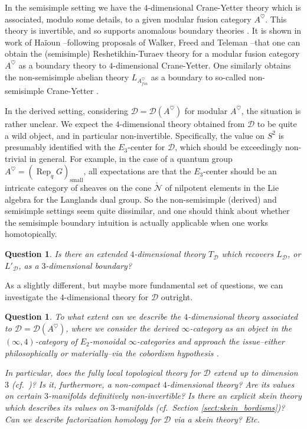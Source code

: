 \documentclass[reqno]{amsart}
\newtheorem{question}[lemma]{Question}
\theoremstyle{definition}
\newcommand{\mcl}[1]{\mathcal{#1}}
\newcommand{\msc}[1]{\mathscr{#1}}
\newcommand{\opn}[1]{\operatorname{#1}}
\DeclareMathOperator{\Rep}{Rep}
\renewcommand{\1}{\mathbf{1}}
\begin{document}
In the semisimple setting we have the $4$-dimensional Crane-Yetter theory which is associated, modulo some details, to a given modular fusion category $A^{\heartsuit}$.  This theory is invertible, and so supports anomalous boundary theories \cite{johnsonscheimbauer17}.  It is shown in work of Ha\"ioun \cite{haioun}--following proposals of Walker, Freed and Teleman \cite{walker1,walker2,freedteleman14}--that one can obtain the (semisimple) Reshetikhin-Turaev theory for a modular fusion category $A^{\heartsuit}$ as a boundary theory to $4$-dimensional Crane-Yetter. One similarly obtains the non-semisimple abelian theory $L_{A^{\heartsuit}_{fin}}$ as a boundary to so-called non-semisimple Crane-Yetter \cite{brochieretal21,haioun}.
\par

In the derived setting, considering $\msc{D}=\msc{D}(A^{\heartsuit})$ for modular $A^{\heartsuit}$, the situation is rather unclear. We expect the $4$-dimensional theory obtained from $\msc{D}$ to be quite a wild object, and in particular non-invertible.  Specifically, the value on $S^2$ is presumably identified with the $E_3$-center for $\msc{D}$, which should be exceedingly non-trivial in general.  For example, in the case of a quantum group $A^{\heartsuit}=(\Rep_qG)_{\opn{small}}$, all expectations are that the $E_3$-center should be an intricate category of sheaves on the cone $\check{\mcl{N}}$ of nilpotent elements in the Lie algebra for the Langlands dual group. So the non-semisimple (derived) and semisimple settings seem quite dissimilar, and one should think about whether the semisimple boundary intuition is actually applicable when one works homotopically.

\begin{question}\label{quest:4}
Is there an extended $4$-dimensional theory $T_{\msc{D}}$ which recovers $L_{\msc{D}}$, or $L'_{\msc{D}}$, as a $3$-dimensional boundary?
\end{question}

As a slightly different, but maybe more fundamental set of questions, we can investigate the $4$-dimensional theory for $\msc{D}$ outright.

\begin{question}\label{quest:4.5}
To what extent can we describe the $4$-dimensional theory associated to $\msc{D}=\msc{D}(A^{\heartsuit})$, where we consider the derived $\infty$-category as an object in the $(\infty,4)$-category of $E_2$-monoidal $\infty$-categories and approach the issue--either philosophically or materially--via the cobordism hypothesis \cite{haugseng17,johnsonscheimbauer17,brochierjordansnyder21,brochieretal21}.
\par

In particular, does the fully local topological theory for $\msc{D}$ extend \emph{up} to dimension $3$ (cf.\ \cite[Theorem 1.2]{brochieretal21})? Is it, furthermore, a non-compact $4$-dimensional theory? Are its values on certain $3$-manifolds definitively non-invertible? Is there an explicit skein theory which describes its values on $3$-manifolds (cf.\ Section \ref{sect:skein_bordisms})? Can we describe factorization homology for $\msc{D}$ via a skein theory? Etc. 
\end{question}
\end{document}
